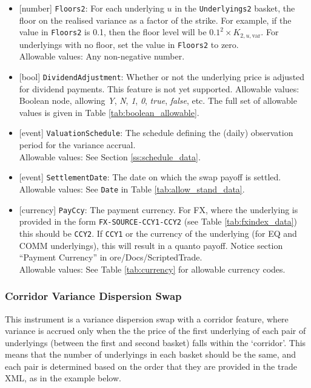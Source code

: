 \begin{itemize}
  Allowable values: Any non-negative number.
  \item{}[number] \lstinline!Floors2!: For each underlying $u$ in the \lstinline!Underlyings2! basket, the floor on the realised
  variance as a factor of the strike. For example, if the value in \lstinline!Floors2! is 0.1, then the floor level will
  be $0.1^2 \times K_{2,u,\text{var}}$. For underlyings with no floor, set the value in \lstinline!Floors2! to zero. \\
  Allowable values: Any non-negative number.
  \item{}[bool] \lstinline!DividendAdjustment!: Whether or not the underlying price is adjusted for dividend payments. This feature is
  not yet supported.
  Allowable values: Boolean node, allowing \emph{Y}, \emph{N}, \emph{1}, \emph{0}, \emph{true}, \emph{false}, etc.
  The full set of allowable values is given in Table \ref{tab:boolean_allowable}.
  \item{}[event] \lstinline!ValuationSchedule!: The schedule defining the (daily) observation period for the variance accrual. \\
  Allowable values: See Section \ref{ss:schedule_data}.
  \item{}[event] \lstinline!SettlementDate!: The date on which the swap payoff is settled. \\
  Allowable values: See \lstinline!Date! in Table \ref{tab:allow_stand_data}.
  \item{}[currency] \lstinline!PayCcy!: The payment currency. For FX, where the underlying is provided
      in the form \lstinline!FX-SOURCE-CCY1-CCY2! (see Table \ref{tab:fxindex_data}) this should
      be \lstinline!CCY2!. If \lstinline!CCY1! or the currency of the underlying (for EQ and
      COMM underlyings), this will result in a quanto payoff. Notice section ``Payment Currency'' in ore/Docs/ScriptedTrade. \\
        Allowable values: See Table \ref{tab:currency} for allowable currency codes.
\end{itemize}

\subsubsection{Corridor Variance Dispersion Swap}

This instrument is a variance dispersion swap with a corridor feature, where variance is accrued only when the
the price of the first underlying of each pair of underlyings (between the first and second basket) falls within
the `corridor'. This means that the number of underlyings in each basket should be the same, and each pair is
determined based on the order that they are provided in the trade XML, as in the example below.

